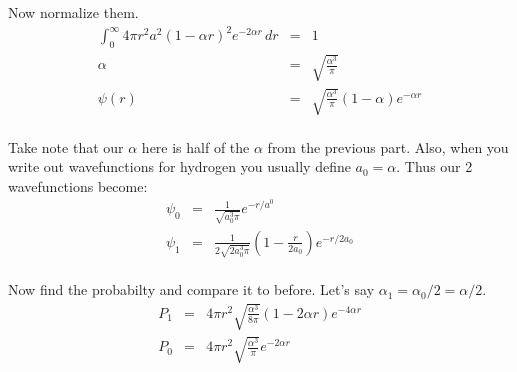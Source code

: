 \documentclass[11pt]{amsart}
\begin{document}
Now normalize them. \\
\begin{eqnarray*} 
\int_{0}^{\infty}4\pi{}r^{2}a^{2}(1-\alpha{r})^{2}e^{-2\alpha{r}}\,dr &=& 1 \\
\alpha &=& \sqrt{\frac{\alpha^{3}}{\pi}} \\
\psi(r) &=& \sqrt{\frac{\alpha^{3}}{\pi}}(1-\alpha)e^{-\alpha{r}} 
\end{eqnarray*} \\
Take note that our $\alpha$ here is half of the $\alpha$ from the previous part. Also, when you write out wavefunctions for hydrogen you usually define $a_{0}=\alpha$. Thus our 2 wavefunctions become: \\
\begin{eqnarray*}
\psi_{0} &=& \frac{1}{\sqrt{a_{0}^{3}\pi}}e^{-r/a^{0}} \\
\psi_{1} &=& \frac{1}{2\sqrt{2a_{0}^{3}\pi}}(1-\frac{r}{2a_{0}})e^{-r/2a_{0}} 
\end{eqnarray*} \\
Now find the probabilty and compare it to before. Let's say $\alpha_{1}=\alpha_{0}/2 = \alpha/2$. \\
\begin{eqnarray*} 
P_{1} &=& 4\pi{r^{2}}\sqrt{\frac{\alpha^{3}}{8\pi}}(1-2\alpha{r})e^{-4\alpha{r}} \\
P_{0} &=& 4\pi{r^{2}}\sqrt{\frac{\alpha^{3}}{\pi}}e^{-2\alpha{r}} 
\end{eqnarray*} 
\end{document}
